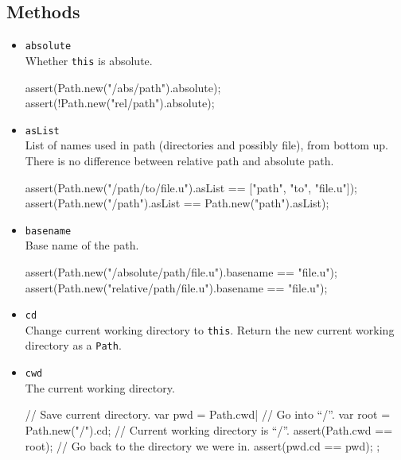 \subsection{Methods}
\begin{itemize}
\item \lstinline|absolute|\\
  Whether \lstinline|this| is absolute.
\begin{urbiscript}[firstnumber=last]
assert(Path.new("/abs/path").absolute);
assert(!Path.new("rel/path").absolute);
\end{urbiscript}

\item \lstinline|asList|\\
  List of names used in path (directories and possibly file), from
  bottom up. There is no difference between relative path and absolute
  path.
\begin{urbiscript}[firstnumber=last]
assert(Path.new("/path/to/file.u").asList == ["path", "to", "file.u"]);
assert(Path.new("/path").asList           == Path.new("path").asList);
\end{urbiscript}

\item \lstinline|basename|\\
  Base name of the path.
\begin{urbiscript}[firstnumber=last]
assert(Path.new("/absolute/path/file.u").basename == "file.u");
assert(Path.new("relative/path/file.u").basename  == "file.u");
\end{urbiscript}

\item \lstinline|cd|\\
  Change current working directory to \lstinline|this|. Return the new
  current working directory as a \lstinline|Path|.

\item \lstinline|cwd|\\
  The current working directory.
\begin{urbiscript}[firstnumber=last]
{
  // Save current directory.
  var pwd = Path.cwd|
  // Go into ``/''.
  var root = Path.new("/").cd;
  // Current working directory is ``/''.
  assert(Path.cwd == root);
  // Go back to the directory we were in.
  assert(pwd.cd == pwd);
};
\end{urbiscript}


\end{itemize}
